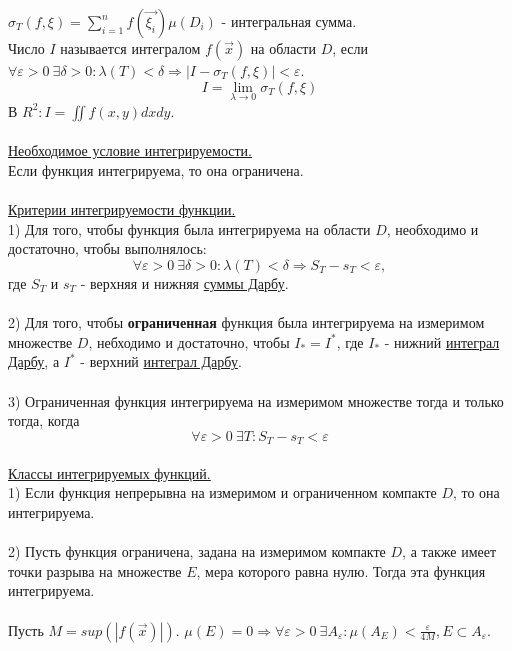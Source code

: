 \documentclass[12pt]{article}
\begin{document}
$\sigma_T(f, \xi) = \sum_{i=1}^n f(\overrightarrow{\xi_i}) \mu(D_i)$ - интегральная сумма.\\
Число $I$ называется интегралом $f(\overrightarrow{x})$ на области $D$, если $\forall \varepsilon >0 \ \exists \delta > 0 : \lambda(T)<\delta \Rightarrow |I - \sigma_T(f,\xi)|<\varepsilon$.\\
$$I = \lim_{\lambda\to 0} \sigma_T (f,\xi)$$
В $R^2: I = \iint f(x,y)dxdy$.\\
\\
\label{question20_2}\uline{Необходимое условие интегрируемости.}\\
Если функция интегрируема, то она ограничена.\\
\\
\label{question20_3}\uline{Критерии интегрируемости функции.}\\
1) Для того, чтобы функция была интегрируема на области $D$, необходимо и достаточно, чтобы выполнялось:\\
$$\forall \varepsilon > 0 \ \exists \delta > 0 : \lambda(T) < \delta \Rightarrow S_T - s_T < \varepsilon,$$
где $S_T$ и $s_T$ - верхняя и нижняя \hyperref[darbouxSum]{суммы Дарбу}.\\
\\
2) Для того, чтобы \textbf{ограниченная} функция была интегрируема на измеримом множестве $D$, небходимо и достаточно, чтобы $I_{*} = I^{*}$, где $I_{*}$ - нижний \hyperref[darbouxInt]{интеграл Дарбу}, а $I^{*}$ - верхний \hyperref[darbouxInt]{интеграл Дарбу}.\\
\\
3) Ограниченная функция интегрируема на измеримом множестве тогда и только тогда, когда\\
$$\forall \varepsilon > 0 \ \exists T : S_T - s_T < \varepsilon$$
\\
\label{question20_4}\uline{Классы интегрируемых функций.}\\
1) Если функция непрерывна на измеримом и ограниченном компакте $D$, то она интегрируема.\\
\\
2) Пусть функция ограничена, задана на измеримом компакте $D$, а также имеет точки разрыва на множестве $E$, мера которого равна нулю. Тогда эта функция интегрируема.\\
\\
Пусть $M = sup(|f(\overrightarrow{x})|)$. $\mu(E) = 0 \Rightarrow \forall \varepsilon > 0 \ \exists A_\varepsilon : \mu(A_E) < \frac{\varepsilon}{4M}, E \subset A_\varepsilon$.\\
\end{document}
